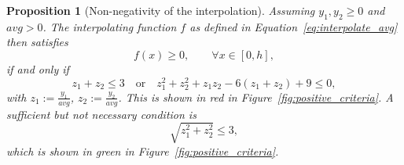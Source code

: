\documentclass[11pt]{article}
\newcommand{\avg}{\textit{avg}}
\theoremstyle{break}            %
\newtheorem{proposition}[theorem]{Proposition}
\begin{document}
\begin{proposition}[Non-negativity of the interpolation]
Assuming $y_1, y_2\geq 0$ and $\avg>0$. The interpolating function $f$
as defined in Equation~\eqref{eq:interpolate_avg} then satisfies
\begin{equation*}
    f(x)\geq 0, \qquad \forall x\in[0,h],
\end{equation*}
if and only if
\begin{equation}
\label{eq:condition_non_negative}
    z_1 + z_2 \leq 3 \quad \text{or} \quad
    z_1^2 + z_2^2 + z_1 z_2 - 6 (z_1+z_2) + 9 \leq 0,
\end{equation}
with $z_1:=\frac{y_1}{\avg}$, $z_2:=\frac{y_2}{\avg}$. This is shown
in red in Figure~\ref{fig:positive_criteria}. A sufficient but not
necessary condition is
\begin{equation}
\label{eq:sufficient_condition_non_negative}
   \sqrt{z_1^2+z_2^2} \leq 3 ,
\end{equation}
which is shown in green in Figure~\ref{fig:positive_criteria}.
\end{proposition}
\end{document}
